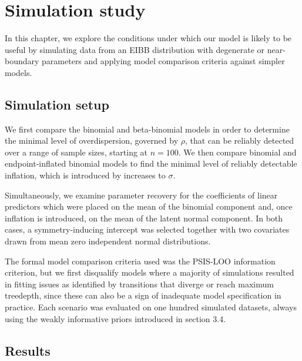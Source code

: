\chapter{Simulation study}
\label{cap:simulation}

In this chapter, we explore the conditions under which our model is likely to be useful by simulating data from an EIBB distribution with degenerate or near-boundary parameters and applying model comparison criteria against simpler models.

\section{Simulation setup}
\label{sec:simsetup}

We first compare the binomial and beta-binomial models in order to determine the minimal level of overdispersion, governed by $\rho$, that can be reliably detected over a range of sample sizes, starting at $n = 100$. We then compare binomial and endpoint-inflated binomial models to find the minimal level of reliably detectable inflation, which is introduced by increases to $\sigma$.

Simultaneously, we examine parameter recovery for the coefficients of linear predictors which were placed on the mean of the binomial component and, once inflation is introduced, on the mean of the latent normal component. In both cases, a symmetry-inducing intercept was selected together with two covariates drawn from mean zero independent normal distributions.

The formal model comparison criteria used was the PSIS-LOO information criterion, but we first disqualify models where a majority of simulations resulted in fitting issues as identified by transitions that diverge or reach maximum treedepth, since these can also be a sign of inadequate model specification in practice. Each scenario was evaluated on one hundred simulated datasets, always using the weakly informative priors introduced in section 3.4. 

\section{Results}
\label{sec:simresults}

